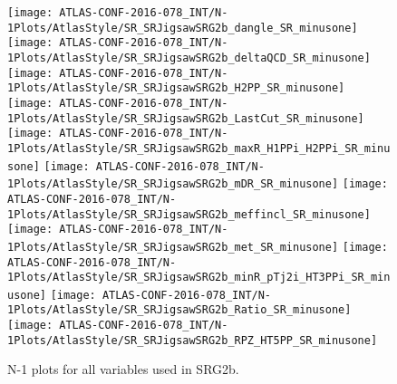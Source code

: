 \begin{figure}[tbp]
\begin{center}
\texttt{[image: ATLAS-CONF-2016-078\_INT/N-1Plots/AtlasStyle/SR\_SRJigsawSRG2b\_dangle\_SR\_minusone]}
\texttt{[image: ATLAS-CONF-2016-078\_INT/N-1Plots/AtlasStyle/SR\_SRJigsawSRG2b\_deltaQCD\_SR\_minusone]}
\texttt{[image: ATLAS-CONF-2016-078\_INT/N-1Plots/AtlasStyle/SR\_SRJigsawSRG2b\_H2PP\_SR\_minusone]}
\texttt{[image: ATLAS-CONF-2016-078\_INT/N-1Plots/AtlasStyle/SR\_SRJigsawSRG2b\_LastCut\_SR\_minusone]}
\texttt{[image: ATLAS-CONF-2016-078\_INT/N-1Plots/AtlasStyle/SR\_SRJigsawSRG2b\_maxR\_H1PPi\_H2PPi\_SR\_minusone]}
\texttt{[image: ATLAS-CONF-2016-078\_INT/N-1Plots/AtlasStyle/SR\_SRJigsawSRG2b\_mDR\_SR\_minusone]}
\texttt{[image: ATLAS-CONF-2016-078\_INT/N-1Plots/AtlasStyle/SR\_SRJigsawSRG2b\_meffincl\_SR\_minusone]}
\texttt{[image: ATLAS-CONF-2016-078\_INT/N-1Plots/AtlasStyle/SR\_SRJigsawSRG2b\_met\_SR\_minusone]}
\texttt{[image: ATLAS-CONF-2016-078\_INT/N-1Plots/AtlasStyle/SR\_SRJigsawSRG2b\_minR\_pTj2i\_HT3PPi\_SR\_minusone]}
\texttt{[image: ATLAS-CONF-2016-078\_INT/N-1Plots/AtlasStyle/SR\_SRJigsawSRG2b\_Ratio\_SR\_minusone]}
\texttt{[image: ATLAS-CONF-2016-078\_INT/N-1Plots/AtlasStyle/SR\_SRJigsawSRG2b\_RPZ\_HT5PP\_SR\_minusone]}
\end{center}
\caption{N-1 plots for all variables used in SRG2b.}
\label{fig:SR_SRJigsawSRG2b_deltaQCD_SR_minusone}
\end{figure}

